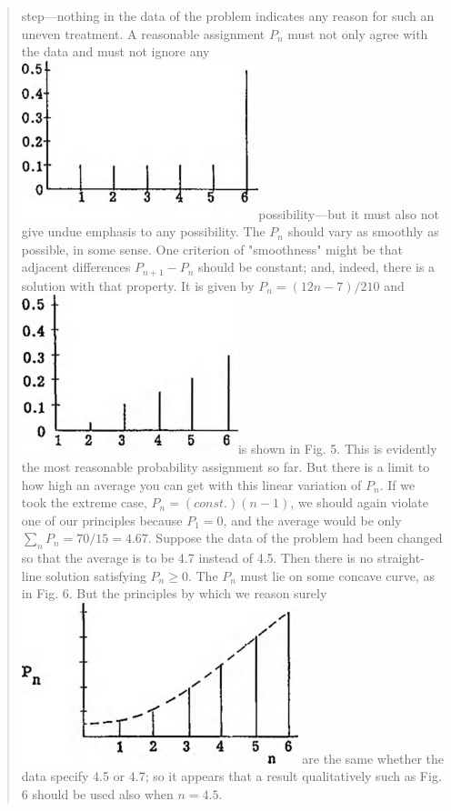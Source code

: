 \documentclass[]{article}
\begin{document}
\begin{quote}
step---nothing in the data of the problem indicates any reason for such
an uneven treatment. A reasonable assignment \(P_{n}\) must not only
agree with the data and must not ignore any
\includegraphics[width=2.71319in,height=1.81042in]{media/image4.jpeg}possibility---but
it must also not give undue emphasis to any possibility. The \(P_{n}\)
should vary as smoothly as possible, in some sense. One criterion of
"smoothness" might be that adjacent differences \(P_{n + 1} - P_{n}\)
should be constant; and, indeed, there is a solution with that property.
It is given by \(P_{n} = (12n - 7)/210\) and
\includegraphics[width=2.48031in,height=1.82283in]{media/image5.jpeg}is
shown in Fig. 5. This is evidently the most reasonable probability
assignment so far. But there is a limit to how high an average you can
get with this linear variation of \(P_{n}\). If we took the extreme
case, \(P_{n} = (const.)(n - 1)\), we should again violate one of our
principles because \(P_{1} = 0\), and the average would be only
\(\sum_{n}^{}{P_{n} = 70/15} = 4.67\). Suppose the data of the problem
had been changed so that the average is to be 4.7 instead of 4.5. Then
there is no straight-line solution satisfying \(P_{n} \geq 0\). The
\(P_{n}\) must lie on some concave curve, as in Fig. 6. But the
principles by which we reason
surely\includegraphics[width=3.16535in,height=1.84252in]{media/image6.jpeg}
are the same whether the data specify 4.5 or 4.7; so it appears that a
result qualitatively such as Fig. 6 should be used also when
\(n = 4.5\).


\end{quote}
\end{document}
